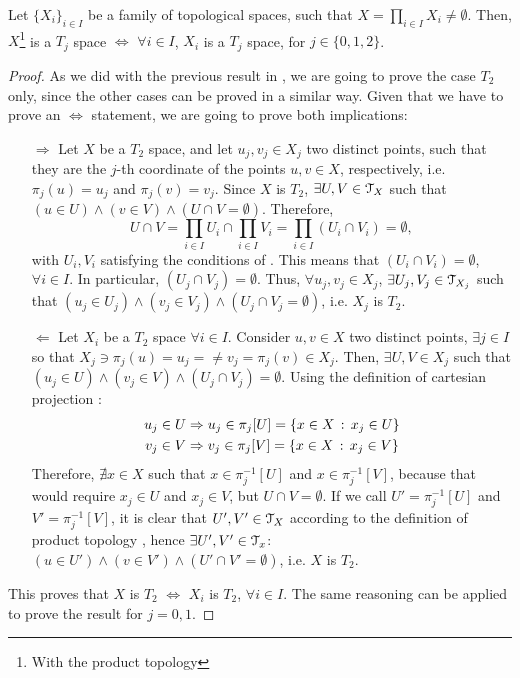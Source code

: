 \begin{theorem}
	\label{th:1-9}
	Let $\{X_i\}_{i\in I}$ be a family of topological spaces, such that \textbf{$X=\prod_{i\in I}X_i\neq \emptyset$}.
	Then, $X$\footnote{With the product topology} is a $T_j$ space $\iff$ $\forall i\in I$, $X_i$ is a $T_j$ space, for $j\in\{0,1,2\}$.
\end{theorem}
\begin{proof}
	As we did with the previous result in , we are going to prove the case $T_2$ only, since the other cases can be proved in a similar way.
	Given that we have to prove an $\iff$ statement, we are going to prove both implications:
	\begin{itemize}
	\item[$\boxed{\Rightarrow}$] Let $X$ be a $T_2$ space, and let $u_j, v_j \in X_j$ two distinct points, such that they are the $j$-th coordinate of the points $u,v\in X$, respectively, i.e. $\pi_j(u)=u_j$ and $\pi_j(v)=v_j$. Since $X$ is $T_2$, $\exists U, V\in \EuScript{T}_X$ such that $(u\in U)\land (v\in V)\land (U\cap V=\emptyset)$. Therefore,
	$$
	U\cap V= \prod_{i\in I}U_i\cap\prod_{i\in I}V_i=\prod_{i\in I}(U_i\cap V_i)=\emptyset,
	$$
	with $U_i, V_i$ satisfying the conditions of .
	This means that $(U_i\cap V_i)=\emptyset$, $\forall i\in I$. In particular, $(U_j\cap V_j)=\emptyset$.
	Thus, $\forall u_j, v_j\in X_j$, $\exists U_j, V_j \in \EuScript{T}_{X_j}$ such that $(u_j\in U_j)\land (v_j\in V_j)\land (U_j\cap V_j=\emptyset)$, i.e. $X_j$ is $T_2$.
	\item[$\boxed{\Leftarrow}$] Let $X_i$ be a $T_2$ space $\forall i\in I$. Consider $u,v\in X$ two distinct points, $\exists j\in I$ so that $X_j\ni \pi_j(u) = u_j = \neq v_j=\pi_j(v)\in X_j$. Then, $\exists U,V \in X_j$ such that $(u_j\in U)\land (v_j\in V)\land (U_j\cap V_j)=\emptyset$.
	Using the definition of cartesian projection :
	\begin{align*}
		u_j\in U &\Rightarrow u_j\in\pi_j[U]=\left\{x\in X\,:\,x_j\in U\right\}\\
		v_j\in V &\Rightarrow v_j\in\pi_j[V]=\left\{x\in X\,:\,x_j\in V\right\}
	\end{align*}
	Therefore, $\nexists x\in X$ such that $x\in \pi^{-1}_j[U]$ and $x\in \pi^{-1}_j[V]$,
	because that would require $x_j\in U$ and $x_j\in V$, but $U\cap V=\emptyset$.
	If we call $U'=\pi^{-1}_j[U]$ and $V'=\pi^{-1}_j[V]$, it is clear that $U', V'\in \EuScript{T}_X$ according to the definition of product topology , hence $\exists U', V' \in \EuScript{T}_x$: $(u\in U')\land (v\in V')\land (U'\cap V'=\emptyset)$, i.e. $X$ is $T_2$.
	\end{itemize}
	This proves that $X$ is $T_2$ $\iff$ $X_i$ is $T_2$, $\forall i\in I$. The same reasoning can be applied to prove the result for $j=0,1$.
\end{proof}

